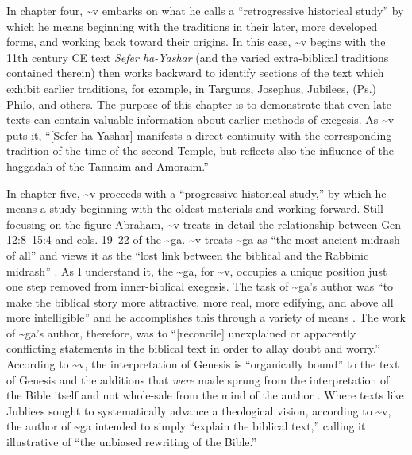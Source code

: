 In chapter four, \textasciitilde{}v embarks on what he calls a
``retrogressive historical study'' by which he means beginning with the
traditions in their later, more developed forms, and working back toward
their origins. In this case, \textasciitilde{}v begins with the 11th
century CE text \emph{Sefer ha-Yashar} (and the varied extra-biblical
traditions contained therein) then works backward to identify sections
of the text which exhibit earlier traditions, for example, in Targums,
Josephus, Jubilees, (Ps.) Philo, and others. The purpose of this chapter
is to demonstrate that even late texts can contain valuable information
about earlier methods of exegesis. As \textasciitilde{}v puts it,
``{[}Sefer ha-Yashar{]} manifests a direct continuity with the
corresponding tradition of the time of the second Temple, but reflects
also the influence of the haggadah of the Tannaim and
Amoraim.''\autocite[95]{vermes1961}

In chapter five, \textasciitilde{}v proceeds with a ``progressive
historical study,'' by which he means a study beginning with the oldest
materials and working forward. Still focusing on the figure Abraham,
\textasciitilde{}v treats in detail the relationship between Gen
12:8--15:4 and cols. 19--22 of the \textasciitilde{}ga.
\textasciitilde{}v treats \textasciitilde{}ga as ``the most ancient
midrash of all''\autocite[124]{vermes1961} and views it as the ``lost
link between the biblical and the Rabbinic midrash''
\autocite[124]{vermes1961}. As I understand it, the \textasciitilde{}ga,
for \textasciitilde{}v, occupies a unique position just one step removed
from inner-biblical exegesis. The task of \textasciitilde{}ga's author
was ``to make the biblical story more attractive, more real, more
edifying, and above all more intelligible'' and he accomplishes this
through a variety of means \autocite[125]{vermes1961}. The work of
\textasciitilde{}ga's author, therefore, was to ``{[}reconcile{]}
unexplained or apparently conflicting statements in the biblical text in
order to allay doubt and worry.''\autocite[125]{vermes1961} According to
\textasciitilde{}v, the interpretation of Genesis is ``organically
bound'' to the text of Genesis and the additions that \emph{were} made
sprung from the interpretation of the Bible itself and not whole-sale
from the mind of the author \autocite[126]{vermes1961}. Where texts like
Jubliees sought to systematically advance a theological vision,
according to \textasciitilde{}v, the author of \textasciitilde{}ga
intended to simply ``explain the biblical text,'' calling it
illustrative of ``the unbiased rewriting of the
Bible.''\autocite[126]{vermes1961}


